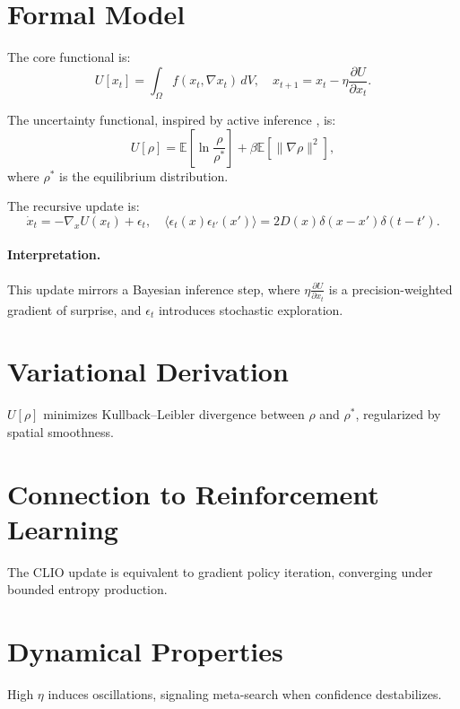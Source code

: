 \documentclass[12pt]{book}
\theoremstyle{definition}
\begin{document}
\section{Formal Model}
The core functional is:
\begin{equation}
U[x_t] = \int_\Omega f(x_t, \nabla x_t) \, dV, \quad x_{t+1} = x_t - \eta \frac{\partial U}{\partial x_t}.
\end{equation}

The uncertainty functional, inspired by active inference \cite{friston2023active}, is:
\begin{equation}
U[\rho] = \mathbb{E}\left[ \ln \frac{\rho}{\rho^*} \right] + \beta \mathbb{E}\left[ \|\nabla \rho\|^2 \right],
\end{equation}
where \(\rho^*\) is the equilibrium distribution.

The recursive update is:
\begin{equation}
\dot{x}_t = -\nabla_x U(x_t) + \epsilon_t, \quad \langle \epsilon_t(x) \epsilon_{t'}(x') \rangle = 2D(x) \delta(x-x') \delta(t-t').
\end{equation}

\paragraph{Interpretation.} This update mirrors a Bayesian inference step, where \(\eta \frac{\partial U}{\partial x_t}\) is a precision-weighted gradient of surprise, and \(\epsilon_t\) introduces stochastic exploration.

\section{Variational Derivation}
\(U[\rho]\) minimizes Kullback–Leibler divergence between \(\rho\) and \(\rho^*\), regularized by spatial smoothness.

\section{Connection to Reinforcement Learning}
The CLIO update is equivalent to gradient policy iteration, converging under bounded entropy production.

\section{Dynamical Properties}
High \(\eta\) induces oscillations, signaling meta-search when confidence destabilizes.
\end{document}
